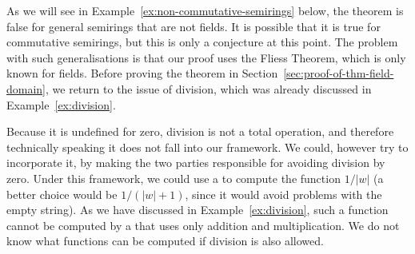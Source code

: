 
As we will see in Example~\ref{ex:non-commutative-semirings} below, the theorem is false for general semirings that are not fields. It is possible that it is true for commutative semirings, but this is only a conjecture at this point. The problem with such generalisations is that our proof uses the  Fliess Theorem, which is only known  for fields.  Before proving the theorem in
Section~\ref{sec:proof-of-thm-field-domain}, we return to the issue of
division, which was already discussed in Example~\ref{ex:division}.

\begin{myexample}\label{ex:division-continued}
    Because it is undefined for zero, division is not a total operation, and
    therefore technically speaking it does not fall into our framework. We
    could, however try to incorporate it, by making the two parties responsible
    for avoiding division by zero. Under this framework, we could use a
     to compute the function $1/|w|$ (a better choice would be
    $1/(|w|+1)$, since it would avoid problems with the empty string). As we have
    discussed in Example~\ref{ex:division}, such a function cannot be computed
    by a  that uses only addition and multiplication. We do not know
    what functions can be computed if division is also allowed.
\end{myexample}



